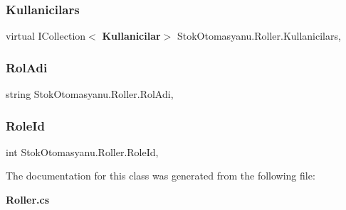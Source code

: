 \subsubsection{Kullanicilars}
{\footnotesize\ttfamily virtual I\+Collection$<$\textbf{ Kullanicilar}$>$ Stok\+Otomasyanu.\+Roller.\+Kullanicilars\hspace{0.3cm}{\ttfamily [get]}, {\ttfamily [set]}}

\mbox{\label{class_stok_otomasyanu_1_1_roller_a50d0a234de87fe1d1813f8e5d552881f}} 
\subsubsection{Rol\+Adi}
{\footnotesize\ttfamily string Stok\+Otomasyanu.\+Roller.\+Rol\+Adi\hspace{0.3cm}{\ttfamily [get]}, {\ttfamily [set]}}

\mbox{\label{class_stok_otomasyanu_1_1_roller_a8e8181d5c0560af6a93b60e4315dde1a}} 
\subsubsection{Role\+Id}
{\footnotesize\ttfamily int Stok\+Otomasyanu.\+Roller.\+Role\+Id\hspace{0.3cm}{\ttfamily [get]}, {\ttfamily [set]}}



The documentation for this class was generated from the following file\+:\begin{DoxyCompactItemize}
\item 
\textbf{ Roller.\+cs}\end{DoxyCompactItemize}
